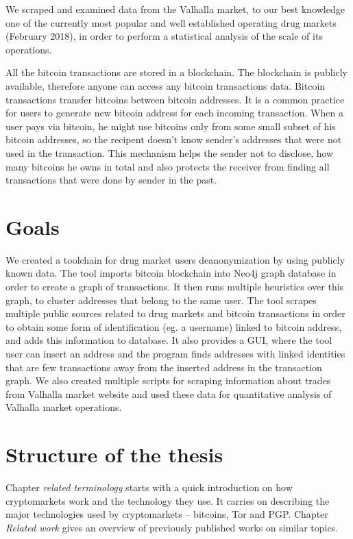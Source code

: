 \documentclass[
  digital, %
  table,   %
  lof,     %
  lot,     %
  oneside
]{fithesis3}
\begin{document}
We scraped and examined data from the Valhalla market,
 to our best knowledge one of the currently most popular and well established operating drug markets (February 2018),
in order to perform a statistical analysis of the scale of its operations.

All the bitcoin transactions are stored in a blockchain. The blockchain is
publicly available, therefore anyone can access any bitcoin transactions data.
Bitcoin transactions transfer bitcoins between bitcoin addresses. It is a common practice for users
to generate new bitcoin address for each incoming transaction.
When a user pays via bitcoin, he might use bitcoins only from some small subset of his bitcoin addresses,
so the recipent doesn't know sender's addresses that were not used in the transaction.
This mechanism helps the sender not to disclose, how many bitcoins he owns in total and also
protects the receiver from finding all transactions that were done by sender in the past.

\section{Goals}

We created a toolchain for drug market users deanonymization by using publicly known data.
The tool imports bitcoin blockchain into Neo4j graph database in order to create a graph of transactions.
It then runs multiple heuristics over this graph, to cluster addresses that belong to the same user.
The tool scrapes multiple public sources related to drug markets and bitcoin transactions in order
to obtain some form of identification (eg. a username) linked to bitcoin address, and adds this information to database.
It also provides a GUI, where the tool user can insert an address and the program finds addresses with linked identities
that are few transactions away from the inserted address in the transaction graph.
We also created multiple scripts for scraping information about trades from Valhalla market website
and used these data for quantitative analysis of Valhalla market operations.

\section{Structure of the thesis}
Chapter \emph{related terminology} starts with a quick introduction
on how cryptomarkets work and the technology they use.
It carries on describing the major technologies used by cryptomarkets -- bitcoins, Tor and PGP.
Chapter \emph{Related work} gives an overview of previously published works on similar topics. 
\end{document}
